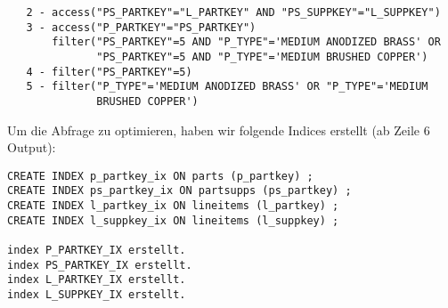 \documentclass[11pt,a4paper,parskip=half]{scrartcl}
\begin{document}
\begin{lstlisting}
   2 - access("PS_PARTKEY"="L_PARTKEY" AND "PS_SUPPKEY"="L_SUPPKEY")                                                                                                                                                                                                                                         
   3 - access("P_PARTKEY"="PS_PARTKEY")                                                                                                                                                                                                                                                                      
       filter("PS_PARTKEY"=5 AND "P_TYPE"='MEDIUM ANODIZED BRASS' OR                                                                                                                                                                                                                                         
              "PS_PARTKEY"=5 AND "P_TYPE"='MEDIUM BRUSHED COPPER')                                                                                                                                                                                                                                           
   4 - filter("PS_PARTKEY"=5)                                                                                                                                                                                                                                                                                
   5 - filter("P_TYPE"='MEDIUM ANODIZED BRASS' OR "P_TYPE"='MEDIUM                                                                                                                                                                                                                                           
              BRUSHED COPPER')                                                                                                                                                                                                                                                                               
\end{lstlisting}

Um die Abfrage zu optimieren, haben wir folgende Indices erstellt (ab Zeile 6 Output):
\begin{lstlisting}
CREATE INDEX p_partkey_ix ON parts (p_partkey) ;
CREATE INDEX ps_partkey_ix ON partsupps (ps_partkey) ;
CREATE INDEX l_partkey_ix ON lineitems (l_partkey) ;
CREATE INDEX l_suppkey_ix ON lineitems (l_suppkey) ;

index P_PARTKEY_IX erstellt.
index PS_PARTKEY_IX erstellt.
index L_PARTKEY_IX erstellt.
index L_SUPPKEY_IX erstellt.
\end{lstlisting}
\end{document}
